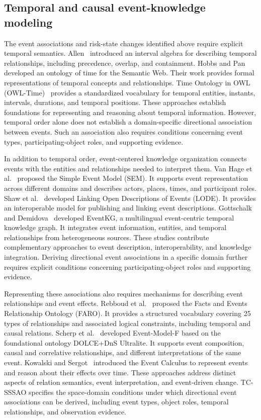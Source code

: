 \documentclass[Royal,sageh,times]{sagej}
\begin{document}
\subsection{Temporal and causal event-knowledge modeling}

The event associations and risk-state changes identified above require explicit temporal semantics. Allen~\citep{allen1983} introduced an interval algebra for describing temporal relationships, including precedence, overlap, and containment. Hobbs and Pan~\citep{hobbs2004time} developed an ontology of time for the Semantic Web. Their work provides formal representations of temporal concepts and relationships. Time Ontology in OWL (OWL-Time)~\citep{cox2017owltime} provides a standardized vocabulary for temporal entities, instants, intervals, durations, and temporal positions. These approaches establish foundations for representing and reasoning about temporal information. However, temporal order alone does not establish a domain-specific directional association between events. Such an association also requires conditions concerning event types, participating-object roles, and supporting evidence.

In addition to temporal order, event-centered knowledge organization connects events with the entities and relationships needed to interpret them. Van Hage et al.~\citep{vanhage2011sem} proposed the Simple Event Model (SEM). It supports event representation across different domains and describes actors, places, times, and participant roles. Shaw et al.~\citep{shaw2009lode} developed Linking Open Descriptions of Events (LODE). It provides an interoperable model for publishing and linking event descriptions. Gottschalk and Demidova~\citep{gottschalk2018eventkg} developed EventKG, a multilingual event-centric temporal knowledge graph. It integrates event information, entities, and temporal relationships from heterogeneous sources. These studies contribute complementary approaches to event description, interoperability, and knowledge integration. Deriving directional event associations in a specific domain further requires explicit conditions concerning participating-object roles and supporting evidence.

Representing these associations also requires mechanisms for describing event relationships and event effects. Rebboud et al.~\citep{rebboud2022faro} proposed the Facts and Events Relationship Ontology (FARO). It provides a structured vocabulary covering 25 types of relationships and associated logical constraints, including temporal and causal relations. Scherp et al.~\citep{scherp2009eventmodel} developed Event-Model-F based on the foundational ontology DOLCE+DnS Ultralite. It supports event composition, causal and correlative relationships, and different interpretations of the same event. Kowalski and Sergot~\citep{kowalski1986} introduced the Event Calculus to represent events and reason about their effects over time. These approaches address distinct aspects of relation semantics, event interpretation, and event-driven change. TC-SSSAO specifies the space-domain conditions under which directional event associations can be derived, including event types, object roles, temporal relationships, and observation evidence.
\end{document}
